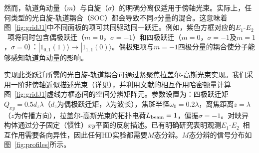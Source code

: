 \documentclass[reprint,aps,prl,twocolumn,superscriptaddress,groupedaddress]{revtex4-2}
\newcommand{\eoet}{$E_1$-$E_2$}
\begin{document}
\begin{CJK*}{UTF8}{gbsn}
然而，轨道角动量（$m$）与自旋（$\sigma$）的明确分离仅适用于傍轴光束。实际上，任何类型的光自旋-轨道耦合（SOC）都会导致不同$\sigma$分量的混合\cite{Bliokh2015,Bliokh2023}。这意味着图~\ref{fig:gridJ1}中不同面板的项可共同驱动同一跃迁。例如，紫色方框对应的\eoet~项将同时包含偶极跃迁（$m=0$，$\sigma=-1$）和四极跃迁（$m=0$，$\sigma=-1$及$m=1$，$\sigma=0$）：$| 1_{0,1}(1) \rangle \to | 1_{1,1}(0) \rangle$。偶极矩项与$m=-1$四极分量的耦合使分子能够感知轨道角动量的影响。

实现此类跃迁所需的光自旋-轨道耦合可通过紧聚焦拉盖尔-高斯光束实现\cite{Loeffler2011,Forbes2021nonparaxial,Forbes2021longitudinal}。我们采用一阶非傍轴近似描述光束\cite{Lax1975}（详见\cite{Note1}），并利用文献\cite{Maslov2024,Maslov_Thesis}的相互作用哈密顿量计算图~\ref{fig:gridJ1}虚线方框态间的空间分辨矩阵元。参数设置为：四极跃迁矩$Q_{xy}=0.5d_z\lambda$（$d_z$为偶极跃迁矩，$\lambda$为波长），焦斑半径$\omega_0=0.2\lambda$，离焦距离$z=\lambda$（$z$为传播方向），拉盖尔-高斯光束的拓扑电荷$L_{\rm beam}=1$，偏振$\sigma=-1$。对映异构体通过分子固定（惯性）$xy$平面的反射描述。已有明确研究\cite{Buckingham1971, Power1975}表明观测\eoet~相互作用需要各向异性，因此任何HD实验都需要$M$态分辨。$M$态分辨的信号分布如图~\ref{fig:profiles}所示。


\end{CJK*}
\end{document}
